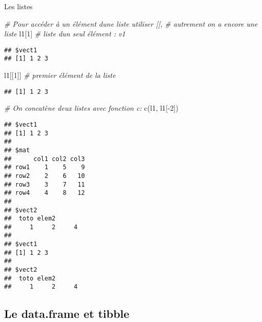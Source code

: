 \documentclass[10pt,xcolor=table,color={dvipsnames,usenames},ignorenonframetext,usepdftitle=false,french]{beamer}
\newenvironment{Shaded}{\begin{snugshade}}{\end{snugshade}}
\newcommand{\CommentTok}[1]{\textcolor[rgb]{0.56,0.35,0.01}{\textit{#1}}}
\newcommand{\DecValTok}[1]{\textcolor[rgb]{0.00,0.00,0.81}{#1}}
\newcommand{\FunctionTok}[1]{\textcolor[rgb]{0.00,0.00,0.00}{#1}}
\newcommand{\NormalTok}[1]{#1}
\newcommand{\SpecialCharTok}[1]{\textcolor[rgb]{0.00,0.00,0.00}{#1}}
\begin{document}
\begin{frame}{Les listes}
\begin{Shaded}
\begin{Highlighting}[]
\CommentTok{\# Pour accéder à un élément d\textquotesingle{}une liste utiliser [[,}
\CommentTok{\# autrement on a encore une liste}
\NormalTok{l1[}\DecValTok{1}\NormalTok{] }\CommentTok{\# liste d\textquotesingle{}un seul élément : v1}
\end{Highlighting}
\end{Shaded}

\begin{verbatim}
## $vect1
## [1] 1 2 3
\end{verbatim}

\begin{Shaded}
\begin{Highlighting}[]
\NormalTok{l1[[}\DecValTok{1}\NormalTok{]] }\CommentTok{\# premier élément de la liste}
\end{Highlighting}
\end{Shaded}

\begin{verbatim}
## [1] 1 2 3
\end{verbatim}

\begin{Shaded}
\begin{Highlighting}[]
\CommentTok{\# On concatène deux listes avec fonction c:}
\FunctionTok{c}\NormalTok{(l1, l1[}\SpecialCharTok{{-}}\DecValTok{2}\NormalTok{])}
\end{Highlighting}
\end{Shaded}

\begin{verbatim}
## $vect1
## [1] 1 2 3
## 
## $mat
##      col1 col2 col3
## row1    1    5    9
## row2    2    6   10
## row3    3    7   11
## row4    4    8   12
## 
## $vect2
##  toto elem2       
##     1     2     4 
## 
## $vect1
## [1] 1 2 3
## 
## $vect2
##  toto elem2       
##     1     2     4
\end{verbatim}
\end{frame}

\hypertarget{le-data.frame-et-tibble}{%
\subsection{Le data.frame et tibble}\label{le-data.frame-et-tibble}}
\end{document}
